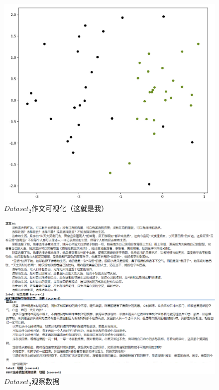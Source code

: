 \documentclass[11pt]{article}
\begin{document}
\begin{CJK}{UTF8}{gkai}
\begin{figure}[htbp]\small
  \centering
  \includegraphics[width=0.6\linewidth]{yl2.png}
  \caption{$Dataset_2$作文可视化（这就是我）}
  \label{framework}
\end{figure}

\begin{figure}[htbp]\small
  \centering
  \includegraphics[width=1.0\linewidth]{zw4.png}
  \caption{$Dataset_2$观察数据}
  \label{framework}
\end{figure}

%
%
%

\end{CJK}
\end{document}

